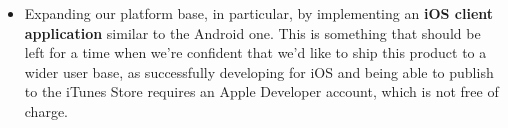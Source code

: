 \documentclass[12p, a4paper, onecolumn]{report}
\begin{document}
\begin{itemize}
	\item Expanding our platform base, in particular, by implementing an \textbf{iOS client application} similar to the Android one. This is something that should be left for a time when we're confident that we'd like to ship this product to a wider user base, as successfully developing for iOS and being able to publish to the iTunes Store requires an Apple Developer account, which is not free of charge.
\end{itemize}
\end{document}
